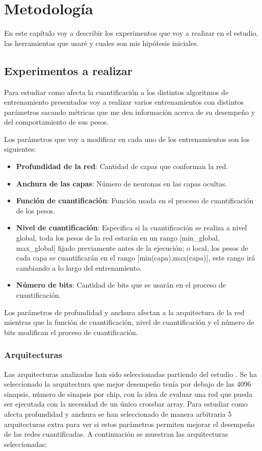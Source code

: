 \chapter{Metodología}  \label{metodologia}

En este capítulo voy a describir los experimentos que voy a realizar en el estudio, las herramientas que usaré y cuales son mis hipótesis iniciales.

\section{Experimentos a realizar}

Para estudiar como afecta la cuantificación a los distintos algoritmos de entrenamiento presentados voy a realizar varios entrenamientos con distintos parámetros sacando métricas que me den información acerca de su desempeño y del comportamiento de sus pesos. 

Los parámetros que voy a modificar en cada uno de los entrenamientos son los siguientes:
\begin{itemize}
    \item \textbf{Profundidad de la red}: Cantidad de capas que conforman la red.
    \item \textbf{Anchura de las capas}: Número de neuronas en las capas ocultas.
    \item \textbf{Función de cuantificación}: Función usada en el proceso de cuantificación de los pesos.
    \item \textbf{Nivel de cuantificación}: Especifica si la cuantificación se realiza a nivel global, toda los pesos de la red estarán en un rango [min\_global, max\_global] fijado previamente antes de la ejecución; o local, los pesos de cada capa se cuantificarán en el rango [min(capa),max(capa)], este rango irá cambiando a lo largo del entrenamiento.
    \item \textbf{Número de bits}: Cantidad de bits que se usarán en el proceso de cuantificación.
\end{itemize}

Los parámetros de profundidad y anchura afectan a la arquitectura de la red mientras que la función de cuantificación, nivel de cuantificación y el número de bits modifican el proceso de cuantificación. 

\subsection{Arquitecturas}
Las arquitecturas analizadas han sido seleccionadas partiendo del estudio \cite{10481/72221}. Se ha seleccionado la arquitectura que mejor desempeño tenía por debajo de las 4096 sinapsis, número de sinapsis por chip, con la idea de evaluar una red que pueda ser ejecutada con la necesidad de un único crossbar array. Para estudiar como afecta profundidad y anchura se han seleccionado de manera arbitraria 5 arquitecturas extra para ver si estos parámetros permiten mejorar el desempeño de las redes cuantificadas. A continuación se muestran las arquitecturas seleccionadas:

